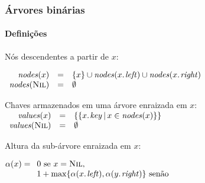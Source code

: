 \documentclass{beamer}
\begin{document}
\begin{frame}

  \frametitle{Árvores binárias}
  \framesubtitle{Definições}

  \begin{definition}
    Nós descendentes a partir de $x$:

    $\begin{array}{rcl}
      \id{nodes}(x) & = & \{ x \} \cup
    \id{nodes}(\attrib{x}{left}) \cup \id{nodes}(\attrib{x}{right}) \\
      \id{nodes}(\const{Nil}) & = & \emptyset
    \end{array}$
  \end{definition}

  \begin{definition}
    Chaves armazenados em uma árvore enraizada em $x$:
    $
    \begin{array}[t]{rcl}
      \id{values}(x) & = & \{ \{ \attrib{x}{key} \, | \, x \in \id{nodes}(x) \} \} \\
      \id{values}(\const{Nil}) & = & \emptyset
    \end{array}
    $
  \end{definition}

  \begin{definition}
    Altura da sub-árvore enraizada em $x$: 

    $\alpha(x) = 
    \begin{array}[t]{l}
      0 \mbox{ se } x = \const{Nil}, \\
      1 + \max \{ \alpha(\attrib{x}{left}), \alpha(\attrib{y}{right}) \} \mbox{ senão}
    \end{array}$
  \end{definition}

\end{frame}
\end{document}
